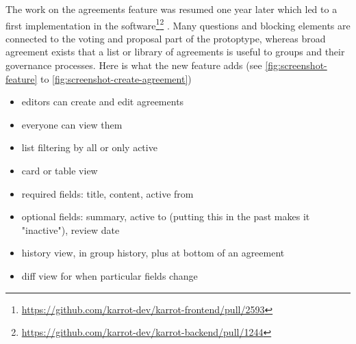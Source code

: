 \documentclass[
	a4paper,%
	11pt,%
	]{article}
\begin{document}
The work on the agreements feature was resumed one year later which led to a first implementation in the software\footnote{\label{url:feature-github-front}\url{https://github.com/karrot-dev/karrot-frontend/pull/2593}}\footnote{\label{url:feature-github-back}\url{https://github.com/karrot-dev/karrot-backend/pull/1244}} . Many questions and blocking elements are connected to the voting and proposal part of the protoptype, whereas broad agreement exists that a list or library of agreements is useful to groups and their governance processes. Here is what the new feature adds (see \autoref{fig:screenshot-feature} to \ref{fig:screenshot-create-agreement})
\begin{itemize}
    \item editors can create and edit agreements
    \item everyone can view them
    \item list filtering by all or only active
    \item card or table view
    \item required fields: title, content, active from
    \item optional fields: summary, active to (putting this in the past makes it "inactive"), review date
    \item history view, in group history, plus at bottom of an agreement
    \item diff view for when particular fields change	
\end{itemize}
\end{document}

